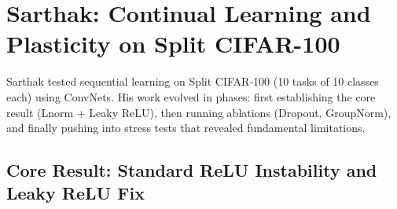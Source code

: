 \documentclass[11pt,a4paper]{article}
\begin{document}
\begin{table}[ht]
\centering
\caption{Spawrious O2O-Hard: comparison against published methods.}
\label{tab:spawrious_compare}
\end{table}


\newpage

\section{Sarthak: Continual Learning and Plasticity on Split CIFAR-100}
\label{sec:sarthak}

Sarthak tested sequential learning on Split CIFAR-100 (10 tasks of 10 classes each) using ConvNets. His work evolved in phases: first establishing the core result (Lnorm + Leaky ReLU), then running ablations (Dropout, GroupNorm), and finally pushing into stress tests that revealed fundamental limitations.

\subsection{Core Result: Standard ReLU Instability and Leaky ReLU Fix}
\end{document}
